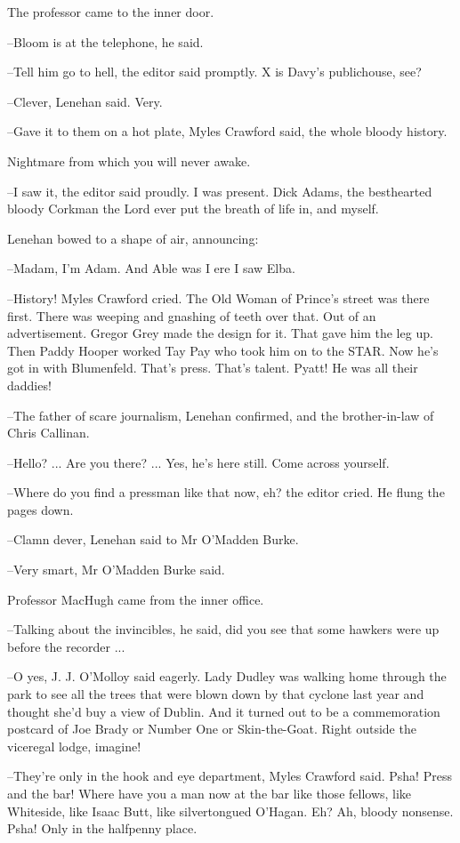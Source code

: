 The professor came to the inner door.

--Bloom is at the telephone, he said.

--Tell him go to hell, the editor said promptly. X is Davy's publichouse,
see?



--Clever, Lenehan said. Very.

--Gave it to them on a hot plate, Myles Crawford said, the whole bloody
history.

Nightmare from which you will never awake.

--I saw it, the editor said proudly. I was present. Dick Adams, the
besthearted bloody Corkman the Lord ever put the breath of life in, and
myself.

Lenehan bowed to a shape of air, announcing:

--Madam, I'm Adam. And Able was I ere I saw Elba.

--History! Myles Crawford cried. The Old Woman of Prince's street was
there first. There was weeping and gnashing of teeth over that. Out of an
advertisement. Gregor Grey made the design for it. That gave him the leg
up. Then Paddy Hooper worked Tay Pay who took him on to the STAR.
Now he's got in with Blumenfeld. That's press. That's talent. Pyatt! He
was all their daddies!

--The father of scare journalism, Lenehan confirmed, and the
brother-in-law of Chris Callinan.

--Hello? ... Are you there? ... Yes, he's here still. Come across
yourself.

--Where do you find a pressman like that now, eh? the editor cried.
He flung the pages down.

--Clamn dever, Lenehan said to Mr O'Madden Burke.

--Very smart, Mr O'Madden Burke said.

Professor MacHugh came from the inner office.

--Talking about the invincibles, he said, did you see that some hawkers
were up before the recorder ...

--O yes, J. J. O'Molloy said eagerly. Lady Dudley was walking home
through the park to see all the trees that were blown down by that cyclone
last year and thought she'd buy a view of Dublin. And it turned out to be
a commemoration postcard of Joe Brady or Number One or Skin-the-Goat.
Right outside the viceregal lodge, imagine!

--They're only in the hook and eye department, Myles Crawford said.
Psha! Press and the bar! Where have you a man now at the bar like those
fellows, like Whiteside, like Isaac Butt, like silvertongued O'Hagan. Eh?
Ah, bloody nonsense. Psha! Only in the halfpenny place.

